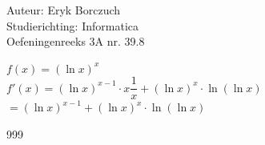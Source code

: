 \documentclass[a4paper]{article}
\begin{document}
  
\noindent \large Auteur: Eryk Borczuch \\
\noindent \large Studierichting: Informatica\\
\noindent \large Oefeningenreeks 3A nr. 39.8\\

\medskip

\normalsize

$f(x) = (\ln x)^x$\\

$f'(x) = (\ln x)^{x-1} \cdot x \dfrac{1}{x} + (\ln x)^x \cdot \ln(\ln x )$\\

$= (\ln x)^{x-1} + (\ln x)^x \cdot \ln(\ln x)$\\

\begin{thebibliography}{999}
\end{thebibliography}
\end{document}

